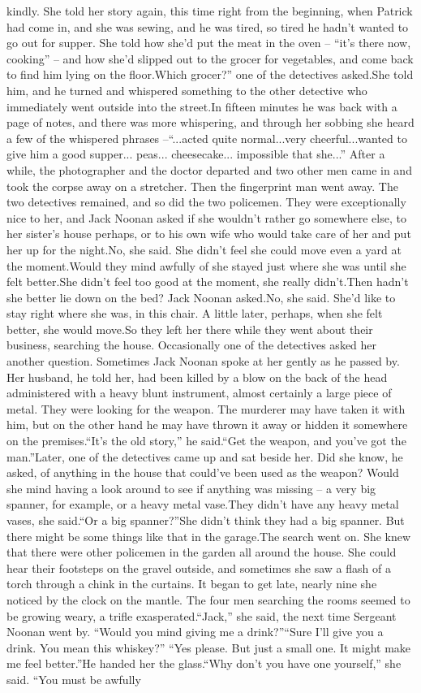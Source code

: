 \documentclass[11pt,a4paper]{article}
\begin{document}
{kindly. She told her story again, this time right from the beginning, when Patrick had come in, and she was sewing, and he was tired, so tired he hadn’t wanted to go out for supper. She told how she’d put the meat in the oven – “it’s there now, cooking” – and how she’d slipped out to the grocer for vegetables, and come back to find him lying on the floor.Which grocer?” one of the detectives asked.She told him, and he turned and whispered something to the other detective who immediately went outside into the street.In fifteen minutes he was back with a page of notes, and there was more whispering, and through her sobbing she heard a few of the whispered phrases –“...acted quite normal...very cheerful...wanted to give him a good supper... peas... cheesecake... impossible that she...” After a while, the photographer and the doctor departed and two other men came in and took the corpse away on a stretcher. Then the fingerprint man went away. The two detectives remained, and so did the two policemen. They were exceptionally nice to her, and Jack Noonan asked if she wouldn’t rather go somewhere else, to her sister’s house perhaps, or to his own wife who would take care of her and put her up for the night.No, she said. She didn’t feel she could move even a yard at the moment.Would they mind awfully of she stayed just where she was until she felt better.She didn’t feel too good at the moment, she really didn’t.Then hadn’t she better lie down on the bed? Jack Noonan asked.No, she said. She’d like to stay right where she was, in this chair. A little later, perhaps, when she felt better, she would move.So they left her there while they went about their business, searching the house. Occasionally one of the detectives asked her another question. Sometimes Jack Noonan spoke at her gently as he passed by. Her husband, he told her, had been killed by a blow on the back of the head administered with a heavy blunt instrument, almost certainly a large piece of metal. They were looking for the weapon. The murderer may have taken it with him, but on the other hand he may have thrown it away or hidden it somewhere on the premises.“It’s the old story,” he said.“Get the weapon, and you’ve got the man.”Later, one of the detectives came up and sat beside her. Did she know, he asked, of anything in the house that could’ve been used as the weapon? Would she mind having a look around to see if anything was missing – a very big spanner, for example, or a heavy metal vase.They didn’t have any heavy metal vases, she said.“Or a big spanner?”She didn’t think they had a big spanner. But there might be some things like that in the garage.The search went on. She knew that there were other policemen in the garden all around the house. She could hear their footsteps on the gravel outside, and sometimes she saw a flash of a torch through a chink in the curtains. It began to get late, nearly nine she noticed by the clock on the mantle. The four men searching the rooms seemed to be growing weary, a trifle exasperated.“Jack,” she said, the next time Sergeant Noonan went by. “Would you mind giving me a drink?”“Sure I’ll give you a drink. You mean this whiskey?” “Yes please. But just a small one. It might make me feel better.”He handed her the glass.“Why don’t you have one yourself,” she said. “You must be awfully }
\end{document}

